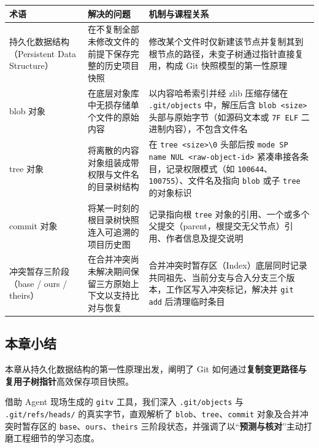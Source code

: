 \documentclass[UTF8,a4paper,11pt,fontset=fandol]{ctexart}
\begin{document}
\begin{center}\small\begin{tabularx}{\linewidth}{YYY}

\toprule

术语 & 解决的问题 & 机制与课程关系\\\midrule

持久化数据结构（Persistent Data Structure） & 在不复制全部未修改文件的前提下保存完整的历史项目快照 & 修改某个文件时仅新建该节点并复制其到根节点的路径，未变子树通过指针直接复用，构成 Git 快照模型的第一性原理\\[3pt]

blob 对象 & 在底层对象库中无损存储单个文件的原始内容 & 以内容哈希索引并经 zlib 压缩存储在 \texttt{.git/objects} 中，解压后含 \texttt{blob <size>} 头部与原始字节（如源码文本或 \texttt{7F ELF} 二进制内容），不包含文件名\\[3pt]

tree 对象 & 将离散的内容对象组装成带权限与文件名的目录树结构 & 在 \texttt{tree <size>\textbackslash{}0} 头部后按 \texttt{mode SP name NUL <raw-object-id>} 紧凑串接各条目，记录权限模式（如 \texttt{100644}、\texttt{100755}）、文件名及指向 \texttt{blob} 或子 \texttt{tree} 的对象标识\\[3pt]

commit 对象 & 将某一时刻的根目录树快照连入可追溯的项目历史图 & 记录指向根 \texttt{tree} 对象的引用、一个或多个父提交（parent，根提交无父节点）引用、作者信息及提交说明\\[3pt]

冲突暂存三阶段（base / ours / theirs） & 在合并冲突尚未解决期间保留三方原始上下文以支持比对与恢复 & 合并冲突时暂存区（Index）底层同时记录共同祖先、当前分支与合入分支三个版本，工作区写入冲突标记，解决并 \texttt{git add} 后清理临时条目\\[3pt]

\bottomrule\end{tabularx}\end{center}

\subsection{本章小结}

本章从持久化数据结构的第一性原理出发，阐明了 Git 如何通过\textbf{复制变更路径与复用子树指针}高效保存项目快照。

借助 Agent 现场生成的 \texttt{gitv} 工具，我们深入 \texttt{.git/objects} 与 \texttt{.git/refs/heads/} 的真实字节，直观解析了 \texttt{blob}、\texttt{tree}、\texttt{commit} 对象及合并冲突时暂存区的 \texttt{base}、\texttt{ours}、\texttt{theirs} 三阶段状态，并强调了以“\textbf{预测与核对}”主动打磨工程细节的学习态度。
\end{document}
